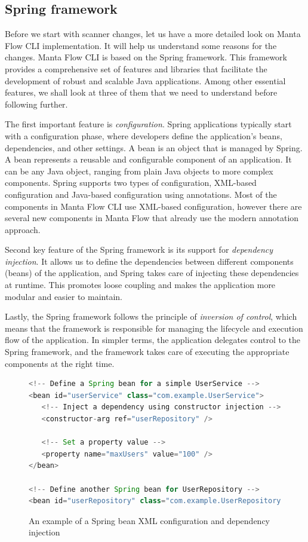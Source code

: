 \subsection{Spring framework}
Before we start with scanner changes, let us have a more detailed look on Manta Flow CLI implementation. It will help us understand some reasons for the changes. Manta Flow CLI is based on the Spring framework. This framework provides a comprehensive set of features and libraries that facilitate the development of robust and scalable Java applications. Among other essential features, we shall look at three of them that we need to understand before following further.
\par
The first important feature is \textit{configuration}. Spring applications typically start with a configuration phase, where developers define the application's beans, dependencies, and other settings. A bean is an object that is managed by Spring. A bean represents a reusable and configurable component of an application. It can be any Java object, ranging from plain Java objects to more complex components. Spring supports two types of configuration, XML-based configuration and Java-based configuration using annotations. Most of the components in Manta Flow CLI use XML-based configuration, however there are several new components in Manta Flow that already use the modern annotation approach.
\par
Second key feature of the Spring framework is its support for \textit{dependency injection}. It allows us to define the dependencies between different components (beans) of the application, and Spring takes care of injecting these dependencies at runtime. This promotes loose coupling and makes the application more modular and easier to maintain.
\par
Lastly, the Spring framework follows the principle of \textit{inversion of control}, which means that the framework is responsible for managing the lifecycle and execution flow of the application. In simpler terms, the application delegates control to the Spring framework, and the framework takes care of executing the appropriate components at the right time.
\begin{figure}[ht]
\begin{lstlisting}[language=Java]
<!-- Define a Spring bean for a simple UserService -->
<bean id="userService" class="com.example.UserService">
   <!-- Inject a dependency using constructor injection -->
   <constructor-arg ref="userRepository" />

   <!-- Set a property value -->
   <property name="maxUsers" value="100" />
</bean>

<!-- Define another Spring bean for UserRepository -->
<bean id="userRepository" class="com.example.UserRepository" />
\end{lstlisting}
\caption{An example of a Spring bean XML configuration and dependency injection}
\label{fig:bean}
\end{figure}
